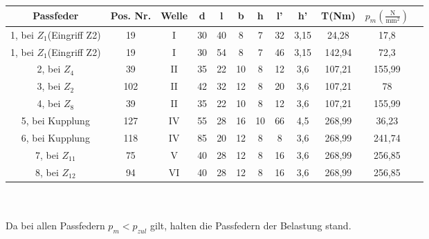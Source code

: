 \begin{tabular}{|c|c|c|c|c|c|c|c|c|c|c|c|}\hline
	 Passfeder & Pos. Nr. &Welle & d & l & b & h & l' & h' & T(Nm) & $p_m(\frac{\text{N}}{\text{mm}^2})$ \\ \hline \hline
	 1, bei $Z_1$(Eingriff Z2) & 19 & $\mathrm{I}$ &30 & 40 & 8 & 7 & 32 & 3,15 & 24,28 & 17,8 \\ \hline
	 1, bei $Z_1$(Eingriff Z2) & 19 & $\mathrm{I}$ &30 & 54 & 8 & 7 & 46 & 3,15 & 142,94 & 72,3 \\ \hline
	 2, bei $Z_4$ & 39 &$\mathrm{II}$ & 35 & 22 & 10 & 8 & 12 & 3,6 & 107,21 & 155,99 \\ \hline
	 3, bei $Z_2$ & 102 &$\mathrm{II}$ & 42 & 32 & 12 & 8 & 20 & 3,6 & 107,21 & 78 \\ \hline
	4, bei $Z_8$ & 39 &$\mathrm{II}$ & 35 & 22 & 10 & 8 & 12 & 3,6 & 107,21 & 155,99 \\ \hline
	5, bei Kupplung & 127 & $\mathrm{IV}$ & 55 & 28 & 16 & 10 & 66 & 4,5 & 268,99 & 36,23 \\ \hline
	 6, bei Kupplung & 118 &$\mathrm{IV}$ & 85 & 20 & 12 & 8 & 8 & 3,6 & 268,99 & 241,74 \\ \hline
	 7, bei $Z_{11}$ & 75 &$\mathrm{V}$ & 40 & 28 & 12 & 8 & 16 & 3,6 & 268,99 & 256,85 \\ \hline
	 8, bei $Z_{12}$ & 94 &$\mathrm{VI}$ & 40 & 28 & 12 & 8 & 16 & 3,6 & 268,99 & 256,85 \\ \hline
\end{tabular} \\
\vspace{.5cm}
\\ Da bei allen Passfedern $p_m < p_{zul}$ gilt, halten die Passfedern der Belastung stand.